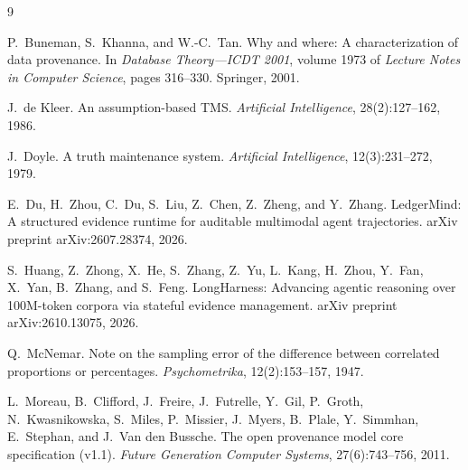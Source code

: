 \documentclass[11pt]{article}
\begin{document}
\begin{thebibliography}{9}

P.~Buneman, S.~Khanna, and W.-C.~Tan.
\newblock Why and where: A characterization of data provenance.
\newblock In \emph{Database Theory---ICDT 2001}, volume 1973 of \emph{Lecture Notes in Computer Science}, pages 316--330. Springer, 2001.

J.~de Kleer.
\newblock An assumption-based TMS.
\newblock \emph{Artificial Intelligence}, 28(2):127--162, 1986.

J.~Doyle.
\newblock A truth maintenance system.
\newblock \emph{Artificial Intelligence}, 12(3):231--272, 1979.

E.~Du, H.~Zhou, C.~Du, S.~Liu, Z.~Chen, Z.~Zheng, and Y.~Zhang.
\newblock LedgerMind: A structured evidence runtime for auditable multimodal agent trajectories.
\newblock arXiv preprint arXiv:2607.28374, 2026.

S.~Huang, Z.~Zhong, X.~He, S.~Zhang, Z.~Yu, L.~Kang, H.~Zhou, Y.~Fan, X.~Yan, B.~Zhang, and S.~Feng.
\newblock LongHarness: Advancing agentic reasoning over 100M-token corpora via stateful evidence management.
\newblock arXiv preprint arXiv:2610.13075, 2026.

Q.~McNemar.
\newblock Note on the sampling error of the difference between correlated proportions or percentages.
\newblock \emph{Psychometrika}, 12(2):153--157, 1947.

L.~Moreau, B.~Clifford, J.~Freire, J.~Futrelle, Y.~Gil, P.~Groth, N.~Kwasnikowska, S.~Miles, P.~Missier, J.~Myers, B.~Plale, Y.~Simmhan, E.~Stephan, and J.~Van den Bussche.
\newblock The open provenance model core specification (v1.1).
\newblock \emph{Future Generation Computer Systems}, 27(6):743--756, 2011.

\end{thebibliography}
\end{document}
